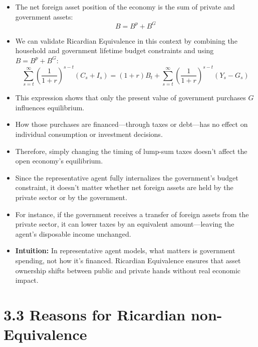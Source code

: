 \documentclass[12pt]{article}
\begin{document}
\begin{itemize}
\item The net foreign asset position of the economy is the sum of private and government assets:
\[
B = B^p + B^G
\]

\item We can validate Ricardian Equivalence in this context by combining the household and government lifetime budget constraints and using $B = B^p + B^G$:
\[
\sum_{s=t}^{\infty} \left( \frac{1}{1 + r} \right)^{s - t} (C_s + I_s)
= (1 + r) B_t + \sum_{s=t}^{\infty} \left( \frac{1}{1 + r} \right)^{s - t} (Y_s - G_s)
\]

\item This expression shows that only the present value of government purchases $G$ influences equilibrium.

\item How those purchases are financed—through taxes or debt—has no effect on individual consumption or investment decisions.

\item Therefore, simply changing the timing of lump-sum taxes doesn't affect the open economy's equilibrium.

\item Since the representative agent fully internalizes the government's budget constraint, it doesn't matter whether net foreign assets are held by the private sector or by the government.

\item For instance, if the government receives a transfer of foreign assets from the private sector, it can lower taxes by an equivalent amount—leaving the agent’s disposable income unchanged.

\item \textbf{Intuition:} In representative agent models, what matters is government spending, not how it’s financed. Ricardian Equivalence ensures that asset ownership shifts between public and private hands without real economic impact.
\end{itemize}

\section*{\noindent\textbf{3.3 Reasons for Ricardian non-Equivalence}}
\end{document}
